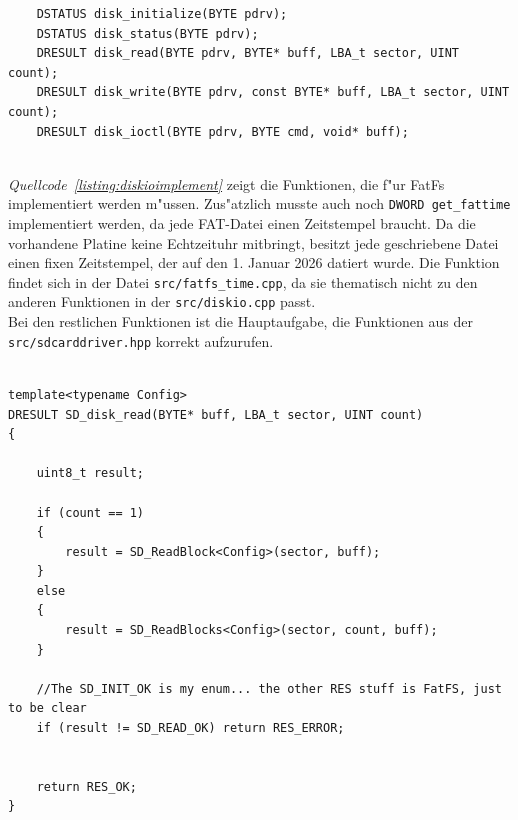 \documentclass[11pt]{article}
\newcommand*{\coderef}[1]{\textit{Quellcode~\ref{#1}}}
\newcommand{\cpp}[1]{\texttt{#1}}
\begin{document}
\begin{listing}[H]
        \begin{verbatim}
    DSTATUS disk_initialize(BYTE pdrv);
    DSTATUS disk_status(BYTE pdrv);
    DRESULT disk_read(BYTE pdrv, BYTE* buff, LBA_t sector, UINT count);
    DRESULT disk_write(BYTE pdrv, const BYTE* buff, LBA_t sector, UINT count);
    DRESULT disk_ioctl(BYTE pdrv, BYTE cmd, void* buff);
    
        \end{verbatim}
\caption{Funktionen, die in der \texttt{src/diskio.cpp} implementiert werden mussten}
\label{listing:diskioimplement}
\end{listing}

\coderef{listing:diskioimplement} zeigt die Funktionen, die f"ur FatFs implementiert werden m"ussen.
Zus"atzlich musste auch noch \cpp{DWORD get_fattime} implementiert werden, da jede FAT-Datei einen 
Zeitstempel braucht. Da die vorhandene Platine keine Echtzeituhr mitbringt, besitzt jede geschriebene
Datei einen fixen Zeitstempel, der auf den 1. Januar 2026 datiert wurde. 
Die Funktion findet sich in der Datei \texttt{src/fatfs\_time.cpp},
da sie thematisch nicht zu den anderen Funktionen in der \texttt{src/diskio.cpp} passt. \\
Bei den restlichen Funktionen ist die Hauptaufgabe, die Funktionen aus der \texttt{src/sdcarddriver.hpp} korrekt
aufzurufen.



\begin{listing}[H]
    \begin{verbatim}

template<typename Config>
DRESULT SD_disk_read(BYTE* buff, LBA_t sector, UINT count)
{

    uint8_t result;

    if (count == 1)
    {
        result = SD_ReadBlock<Config>(sector, buff);
    }
    else
    {
        result = SD_ReadBlocks<Config>(sector, count, buff);
    }

    //The SD_INIT_OK is my enum... the other RES stuff is FatFS, just to be clear
    if (result != SD_READ_OK) return RES_ERROR;


    return RES_OK;
}
    \end{verbatim}
\caption{Implementierung SD\_disk\_read}
\label{listing:cpp-diskread}
\end{listing}
\end{document}
